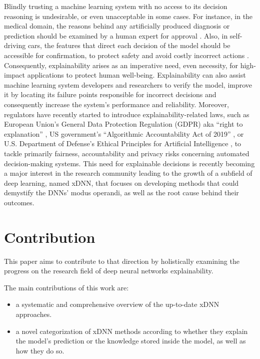 \documentclass[journal]{IEEEtran}
\begin{document}
Blindly trusting a machine learning system with no access to its decision reasoning is undesirable, or even unacceptable in some cases. For instance, in the medical domain, the reasons behind any artificially produced diagnosis or prediction should be examined by a human expert for approval \cite{Samek2017}. Also, in self-driving cars, the features that direct each decision of the model should be accessible for confirmation, to protect safety and avoid costly incorrect actions \cite{Samek2017}. Consequently, explainability arises as an imperative need, even necessity, for high-impact applications to protect human well-being.
Explainability can also assist machine learning system developers and researchers to verify the model, improve it by locating its failure points responsible for incorrect decisions and consequently increase the system’s performance and reliability.
Moreover, regulators have recently started to introduce explainability-related laws, such as European Union’s General Data Protection Regulation (GDPR) \cite{Ras2018} aka “right to explanation” \cite{Goodman2017}, US government’s “Algorithmic Accountability Act of 2019” \cite{Wyden2019}, or U.S. Department of Defense’s Ethical Principles for Artificial Intelligence \cite{Esper2020}, to tackle primarily fairness, accountability and privacy risks concerning automated decision-making systems.
This need for explainable decisions is recently becoming a major interest in the research community leading to the growth of a subfield of deep learning, named xDNN, that focuses on developing methods that could demystify the DNNs’ modus operandi, as well as the root cause behind their outcomes.

\section{Contribution}

This paper aims to contribute to that direction by holistically examining the progress on the research field of deep neural networks explainability.  

The main contributions of this work are: 
\begin{itemize}
\item a systematic and comprehensive overview of the up-to-date xDNN approaches. 
\item a novel categorization of xDNN methods according to whether they explain the model's prediction or the knowledge stored inside the model, as well as how they do so.
\end{itemize}
\end{document}
